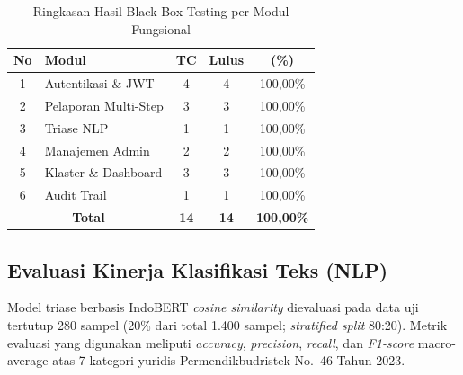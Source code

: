 \documentclass[conference]{IEEEtran}
\begin{document}
\begin{table}[htbp]
\caption{Ringkasan Hasil Black-Box Testing per Modul Fungsional}
\label{tab:blackbox}
\begin{center}
\begin{tabular}{|c|p{3.0cm}|c|c|c|}
\hline
\textbf{No} & \textbf{Modul} & \textbf{TC} & \textbf{Lulus} & \textbf{(\%)} \\
\hline
1 & Autentikasi \& JWT & 4 & 4 & 100,00\% \\
\hline
2 & Pelaporan Multi-Step & 3 & 3 & 100,00\% \\
\hline
3 & Triase NLP & 1 & 1 & 100,00\% \\
\hline
4 & Manajemen Admin & 2 & 2 & 100,00\% \\
\hline
5 & Klaster \& Dashboard & 3 & 3 & 100,00\% \\
\hline
6 & Audit Trail & 1 & 1 & 100,00\% \\
\hline
\multicolumn{2}{|c|}{\textbf{Total}} & \textbf{14} & \textbf{14} & \textbf{100,00\%} \\
\hline
\end{tabular}
\end{center}
\end{table}

\subsection{Evaluasi Kinerja Klasifikasi Teks (NLP)}

Model triase berbasis IndoBERT \textit{cosine similarity} dievaluasi pada data uji tertutup 280 sampel (20\% dari total 1.400 sampel; \textit{stratified split} 80:20). Metrik evaluasi yang digunakan meliputi \textit{accuracy}, \textit{precision}, \textit{recall}, dan \textit{F1-score} macro-average atas 7 kategori yuridis Permendikbudristek No.~46 Tahun 2023.
\end{document}
